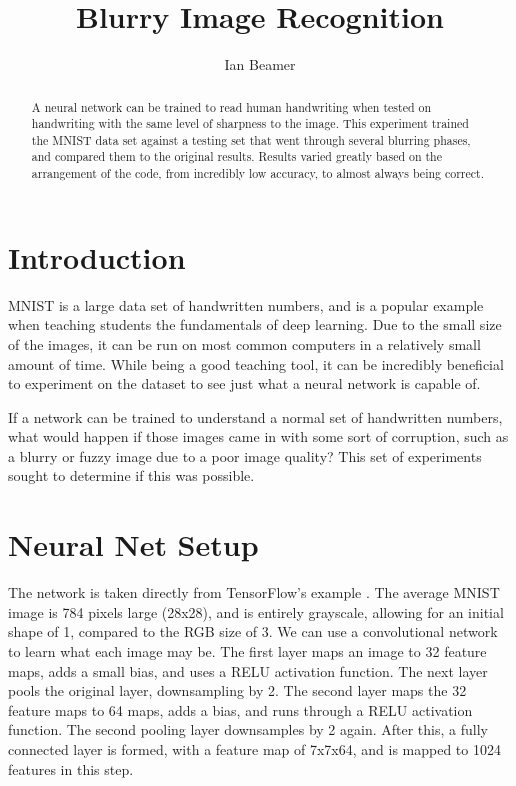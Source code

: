 \documentclass[a4paper]{article}
\title{Blurry Image Recognition}
\author{Ian Beamer}
\begin{document}
\maketitle

\begin{abstract}
A neural network can be trained to read human handwriting when tested on handwriting with the same level of sharpness to the image. This experiment trained the MNIST data set against a testing set that went through several blurring phases, and compared them to the original results. Results varied greatly based on the arrangement of the code, from incredibly low accuracy, to almost always being correct.
\end{abstract}

\section{Introduction}

MNIST is a large data set of handwritten numbers, and is a popular example when teaching students the fundamentals of deep learning. Due to the small size of the images, it can be run on most common computers in a relatively small amount of time. While being a good teaching tool, it can be incredibly beneficial to experiment on the dataset to see just what a neural network is capable of. \cite{Goodfellow-et-al-2016}

If a network can be trained to understand a normal set of handwritten numbers, what would happen if those images came in with some sort of corruption, such as a blurry or fuzzy image due to a poor image quality? This set of experiments sought to determine if this was possible.

\section{Neural Net Setup}
The network is taken directly from TensorFlow's example \cite{tensorflowTutorial} . The average MNIST image is 784 pixels large (28x28), and is entirely grayscale, allowing for an initial shape of 1, compared to the RGB size of 3. We can use a convolutional network to learn what each image may be. The first layer maps an image to 32 feature maps, adds a small bias, and uses a RELU activation function. The next layer pools the original layer, downsampling by 2. The second layer maps the 32 feature maps to 64 maps, adds a bias, and runs through a RELU activation function. The second pooling layer downsamples by 2 again. After this, a fully connected layer is formed, with a feature map of 7x7x64, and is mapped to 1024 features in this step. \cite{tensorflowSource}
\end{document}
